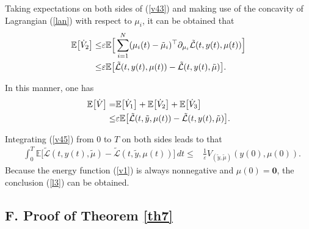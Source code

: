 \documentclass[final,5p,times,twocolumn,authoryear]{elsarticle}
\begin{document}
	Taking expectations on both sides of (\ref{v43}) and making use of the concavity of Lagrangian (\ref{lan}) with respect to $\mu_i$, it can be obtained that
	\begin{align}
		\mathbb{E}\big[\dot{V}_{2}\big]
		\le &\varepsilon\mathbb{E}\Big[\sum_{i=1}^{N}(\mu_i(t)-\tilde{\mu}_i)^\top \partial_{\mu_i}\mathcal{\tilde{L}}(t,y(t),\mu(t))\Big]\notag\\
		\le
		&\varepsilon\mathbb{E}\big[\mathcal{\tilde{L}}(t,y(t),\mu(t))-\mathcal{\tilde{L}}(t,y(t),\tilde{\mu})\big].\label{v44}
	\end{align}
	
	
	
	
	In this manner, one has
	\begin{align}
		\mathbb{E}\big[\dot{V}\big]
		=
		&\mathbb{E}\big[\dot{V}_{1}\big]+\mathbb{E}\big[\dot{V}_{2}\big] + \mathbb{E}\big[\dot{V}_{3}\big]\notag\\
		\le
		&\varepsilon \mathbb{E}\big[\mathcal{\tilde{L}}(t,\tilde y,\mu(t))-\mathcal{\tilde{L}}(t,y(t),\tilde{\mu})\big].\label{v45}
	\end{align}
	
	
	Integrating (\ref{v45}) from $0$ to $T$ on both sides leads to that
	\begin{align}
		&\int_{0}^{T} \mathbb{E}\big[ \mathcal{\tilde{L}}(t,y(t),\tilde{\mu}) - \mathcal{\tilde{L}}(t,\tilde y,\mu(t)) \big] \,dt
		\le&\frac{1}{\varepsilon}		
		V_{(\tilde{y}, \tilde{\mu})}(y(0), \mu(0))
		.
	\end{align}
	Because the energy function (\ref{v1}) is always nonnegative and $\mu(0)=\boldsymbol{0}$, the conclusion (\ref{l3}) can be obtained.
	
	
	\subsection*{F. Proof of Theorem \ref{th7}}	\label{pth7}
	
\end{document}
